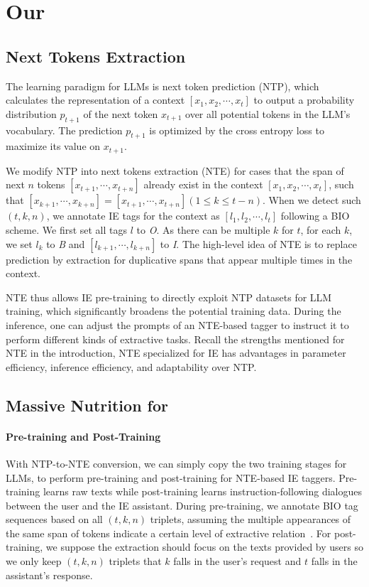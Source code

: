\section{Our \our}

\subsection{Next Tokens Extraction}

The learning paradigm for LLMs is next token prediction (NTP), which calculates the representation of a context $[x_1, x_2, \cdots, x_t]$ to output a probability distribution $p_{t+1}$ of the next token $x_{t+1}$ over all potential tokens in the LLM's vocabulary. The prediction $p_{t+1}$ is optimized by the cross entropy loss to maximize its value on $x_{t+1}$.

We modify NTP into next tokens extraction (NTE) for cases that the span of next $n$ tokens $[x_{t+1}, \cdots, x_{t+n}]$ already exist in the context $[x_1, x_2, \cdots, x_t]$, such that $[x_{k+1}, \cdots, x_{k+n}] = [x_{t+1}, \cdots, x_{t+n}] (1 \leq k \leq t-n)$. When we detect such $(t,k,n)$, we annotate IE tags for the context as $[l_1, l_2, \cdots, l_t]$ following a BIO scheme. We first set all tags $l$ to \textit{O}. As there can be multiple $k$ for $t$, for each $k$, we set $l_k$ to \textit{B} and $[l_{k+1}, \cdots, l_{k+n}]$ to \textit{I}. The high-level idea of NTE is to replace prediction by extraction for duplicative spans that appear multiple times in the context.

NTE thus allows IE pre-training to directly exploit NTP datasets for LLM training, which significantly broadens the potential training data. During the inference, one can adjust the prompts of an NTE-based tagger to instruct it to perform different kinds of extractive tasks. Recall the strengths mentioned for NTE in the introduction, NTE specialized for IE has advantages in parameter efficiency, inference efficiency, and adaptability over NTP. 

\subsection{Massive Nutrition for \our}

\paragraph{Pre-training and Post-Training} With NTP-to-NTE conversion, we can simply copy the two training stages for LLMs, to perform pre-training and post-training for NTE-based IE taggers. Pre-training learns raw texts while post-training learns instruction-following dialogues between the user and the IE assistant. During pre-training, we annotate BIO tag sequences based on all $(t,k,n)$ triplets, assuming the multiple appearances of the same span of tokens indicate a certain level of extractive relation~\citep{UCPhrase}. For post-training, we suppose the extraction should focus on the texts provided by users so we only keep $(t,k,n)$ triplets that $k$ falls in the user's request and $t$ falls in the assistant's response.

